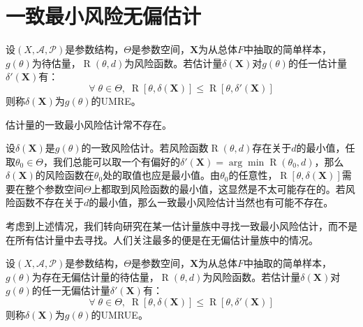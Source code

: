 \section{一致最小风险无偏估计}

\begin{definition}
	设$(X,\mathscr{A},\mathscr{P})$是参数结构，$\Theta$是参数空间，$\mathbf{X}$为从总体$F$中抽取的简单样本，$g(\theta)$为待估量，$\operatorname{R}(\theta,d)$为风险函数。若估计量$\delta(\mathbf{X})$对$g(\theta)$的任一估计量$\delta'(\mathbf{X})$有：
	\begin{equation*}
		\forall\;\theta\in\Theta,\;\operatorname{R}[\theta,\delta(\mathbf{X})]\leqslant\operatorname{R}[\theta,\delta'(\mathbf{X})]
	\end{equation*}
	则称$\delta(\mathbf{X})$为$g(\theta)$的\gls{UMRE}。
\end{definition}
\begin{note}
	估计量的一致最小风险估计常不存在。\par
	设$\delta(\mathbf{X})$是$g(\theta)$的一致风险估计。若风险函数$\operatorname{R}(\theta,d)$存在关于$d$的最小值，任取$\theta_0\in\Theta$，我们总能可以取一个有偏好的$\delta'(\mathbf{X})=\arg\min\operatorname{R}(\theta_0,d)$，那么$\delta(\mathbf{X})$的风险函数在$\theta_0$处的取值也应是最小值。由$\theta_0$的任意性，$\operatorname{R}[\theta,\delta(\mathbf{X})]$需要在整个参数空间$\Theta$上都取到风险函数的最小值，这显然是不太可能存在的。若风险函数不存在关于$d$的最小值，那么一致最小风险估计当然也有可能不存在。\par
	考虑到上述情况，我们转向研究在某一估计量族中寻找一致最小风险估计，而不是在所有估计量中去寻找。人们关注最多的便是在无偏估计量族中的情况。
\end{note}
\begin{definition}
	设$(X,\mathscr{A},\mathscr{P})$是参数结构，$\Theta$是参数空间，$\mathbf{X}$为从总体$F$中抽取的简单样本，$g(\theta)$为存在无偏估计量的待估量，$\operatorname{R}(\theta,d)$为风险函数。若估计量$\delta(\mathbf{X})$对$g(\theta)$的任一无偏估计量$\delta'(\mathbf{X})$有：
	\begin{equation*}
		\forall\;\theta\in\Theta,\;\operatorname{R}[\theta,\delta(\mathbf{X})]\leqslant\operatorname{R}[\theta,\delta'(\mathbf{X})]
	\end{equation*}
	则称$\delta(\mathbf{X})$为$g(\theta)$的\gls{UMRUE}。
\end{definition}
